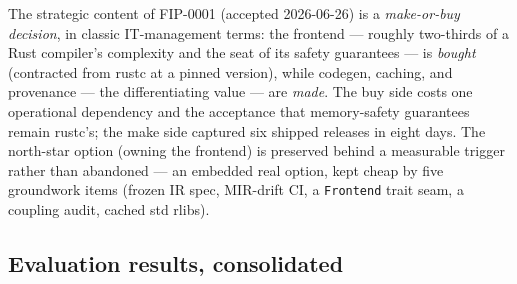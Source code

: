 The strategic content of FIP-0001 (accepted 2026-06-26) is a \emph{make-or-buy decision}, in classic IT-management terms: the frontend --- roughly two-thirds of a Rust compiler's complexity and the seat of its safety guarantees --- is \emph{bought} (contracted from rustc at a pinned version), while codegen, caching, and provenance --- the differentiating value --- are \emph{made}. The buy side costs one operational dependency and the acceptance that memory-safety guarantees remain rustc's; the make side captured six shipped releases in eight days. The north-star option (owning the frontend) is preserved behind a measurable trigger rather than abandoned --- an embedded real option, kept cheap by five groundwork items (frozen IR spec, MIR-drift CI, a \texttt{Frontend} trait seam, a coupling audit, cached std rlibs).

\subsection{Evaluation results, consolidated}

\begin{table}[h]
\centering
\small
{}
\caption{Consolidated evaluation. Each claim names its evidence \emph{kind} --- the project's rule is that a claim without an executable, recomputable, or journaled proof is ``still pretend.''}
\label{tab:eval}
\end{table}

